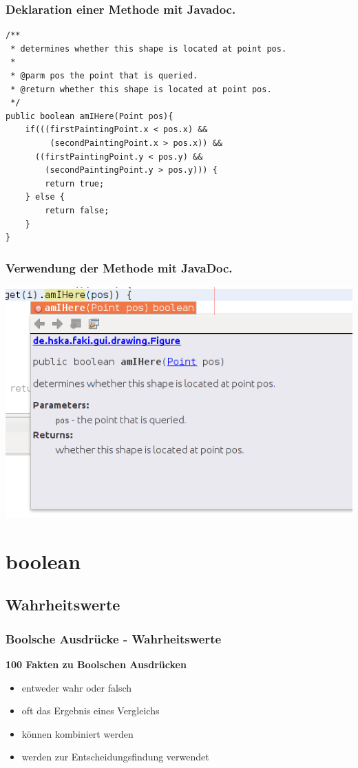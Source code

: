 \documentclass[final]{beamer}
\begin{document}
\begin{frame}[containsverbatim]
	\frametitle{Deklaration einer Methode mit Javadoc.}
	\begin{lstlisting}
/**
 * determines whether this shape is located at point pos.
 * 
 * @parm pos the point that is queried.
 * @return whether this shape is located at point pos.
 */
public boolean amIHere(Point pos){
	if(((firstPaintingPoint.x < pos.x) &&
		 (secondPaintingPoint.x > pos.x)) &&
	  ((firstPaintingPoint.y < pos.y) &&
		(secondPaintingPoint.y > pos.y))) {
		return true;
	} else {
		return false;
	}
}
	\end{lstlisting}
\end{frame}

\begin{frame}
	\frametitle{Verwendung der Methode mit JavaDoc.}
	\includegraphics[scale=0.5]{JavaDoc_example_2_1.png}
\end{frame}

\section{boolean}
\subsection{Wahrheitswerte}
\begin{frame}
	\frametitle{Boolsche Ausdrücke - Wahrheitswerte}
	\textbf{100 Fakten zu Boolschen Ausdrücken}
	\begin{itemize}
		\item{entweder wahr oder falsch}
		\item{oft das Ergebnis eines Vergleichs}
		\item{können kombiniert werden}
		\item{werden zur Entscheidungsfindung verwendet}
	\end{itemize}
\end{frame}
\end{document}
